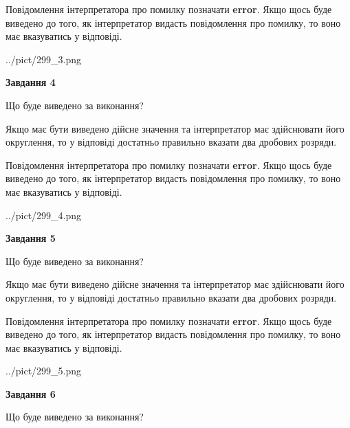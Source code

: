 \documentclass[12pt, ukrainian]{article}
\begin{document}
{\begin {Large}
Повідомлення інтерпретатора про помилку позначати \textbf{error}.
Якщо щось буде виведено до того, як інтерпретатор видасть повідомлення про помилку, 
то воно має вказуватись у відповіді. \par

\begin{center}
	{../pict/299_3.png}
\end{center}
\newpage

{\begin {center}\textbf{Завдання 4}\end {center}}\par
Що буде виведено за виконання? \par

Якщо має бути виведено дійсне значення та інтерпретатор має здійснювати його округлення, 
то у відповіді достатньо правильно вказати два дробових розряди.

Повідомлення інтерпретатора про помилку позначати \textbf{error}.
Якщо щось буде виведено до того, як інтерпретатор видасть повідомлення про помилку, 
то воно має вказуватись у відповіді. \par

\begin{center}
	{../pict/299_4.png}
\end{center}
\newpage

{\begin {center}\textbf{Завдання 5}\end {center}}\par
Що буде виведено за виконання? \par

Якщо має бути виведено дійсне значення та інтерпретатор має здійснювати його округлення, 
то у відповіді достатньо правильно вказати два дробових розряди.

Повідомлення інтерпретатора про помилку позначати \textbf{error}.
Якщо щось буде виведено до того, як інтерпретатор видасть повідомлення про помилку, 
то воно має вказуватись у відповіді. \par

\begin{center}
	{../pict/299_5.png}
\end{center}
\newpage

{\begin {center}\textbf{Завдання 6}\end {center}}\par
Що буде виведено за виконання? \par


\end{Large}}
\end{document}
